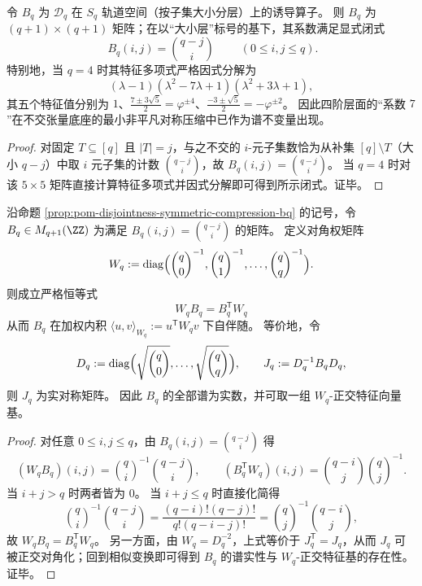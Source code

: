 \begin{proposition}\label{prop:pom-disjointness-symmetric-compression-bq}
令 \(B_q\) 为 \(\mathcal{D}_q\) 在 \(S_q\) 轨道空间（按子集大小分层）上的诱导算子。
则 \(B_q\) 为 \((q+1)\times(q+1)\) 矩阵；在以“大小层”标号的基下，其系数满足显式闭式
\[
\boxed{\;B_q(i,j)=\binom{q-j}{i}\;}\qquad(0\le i,j\le q).
\]
特别地，当 \(q=4\) 时其特征多项式严格因式分解为
\[
(\lambda-1)(\lambda^2-7\lambda+1)(\lambda^2+3\lambda+1),
\]
其五个特征值分别为
\(
1
\)、\(
\frac{7\pm 3\sqrt5}{2}=\varphi^{\pm 4}
\)、\(
\frac{-3\pm\sqrt5}{2}=-\varphi^{\pm 2}
\)。
因此四阶层面的“系数 \(7\)”在不交张量底座的最小非平凡对称压缩中已作为谱不变量出现。
\end{proposition}
\begin{proof}
对固定 \(T\subseteq[q]\) 且 \(|T|=j\)，与之不交的 \(i\)-元子集数恰为从补集 \([q]\setminus T\)（大小 \(q-j\)）中取 \(i\) 元子集的计数 \(\binom{q-j}{i}\)，故 \(B_q(i,j)=\binom{q-j}{i}\)。
当 \(q=4\) 时对该 \(5\times 5\) 矩阵直接计算特征多项式并因式分解即可得到所示闭式。证毕。
\end{proof}


\begin{proposition}\label{prop:pom-bq-weighted-selfadjoint-binomial}
沿命题 \ref{prop:pom-disjointness-symmetric-compression-bq} 的记号，令 \(B_q\in M_{q+1}(\ZZ)\) 为满足 \(B_q(i,j)=\binom{q-j}{i}\) 的矩阵。
定义对角权矩阵
\[
W_q:=\mathrm{diag}\Bigl(\binom{q}{0}^{-1},\binom{q}{1}^{-1},\dots,\binom{q}{q}^{-1}\Bigr).
\]
则成立严格恒等式
\[
\boxed{\;W_qB_q=B_q^{\mathsf T}W_q\;}
\]
从而 \(B_q\) 在加权内积 \(\langle u,v\rangle_{W_q}:=u^{\mathsf T}W_qv\) 下自伴随。
等价地，令
\[
D_q:=\mathrm{diag}\Bigl(\sqrt{\binom{q}{0}},\dots,\sqrt{\binom{q}{q}}\Bigr),
\qquad
J_q:=D_q^{-1}B_qD_q,
\]
则 \(J_q\) 为实对称矩阵。
因此 \(B_q\) 的全部谱为实数，并可取一组 \(W_q\)-正交特征向量基。
\end{proposition}
\begin{proof}
对任意 \(0\le i,j\le q\)，由 \(B_q(i,j)=\binom{q-j}{i}\) 得
\[
(W_qB_q)(i,j)=\binom{q}{i}^{-1}\binom{q-j}{i},
\qquad
(B_q^{\mathsf T}W_q)(i,j)=\binom{q-i}{j}\binom{q}{j}^{-1}.
\]
当 \(i+j>q\) 时两者皆为 \(0\)。
当 \(i+j\le q\) 时直接化简得
\[
\binom{q}{i}^{-1}\binom{q-j}{i}
=\frac{(q-i)!(q-j)!}{q!(q-i-j)!}
=\binom{q}{j}^{-1}\binom{q-i}{j},
\]
故 \(W_qB_q=B_q^{\mathsf T}W_q\)。
另一方面，由 \(W_q=D_q^{-2}\)，上式等价于 \(J_q^{\mathsf T}=J_q\)，从而 \(J_q\) 可被正交对角化；回到相似变换即可得到 \(B_q\) 的谱实性与 \(W_q\)-正交特征基的存在性。证毕。
\end{proof}

